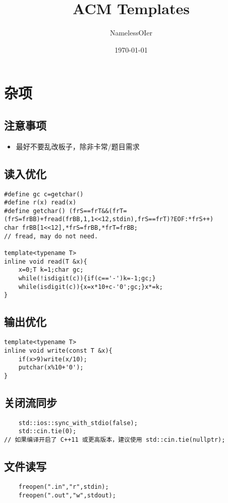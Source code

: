 \documentclass{ctexart}
\title{ACM Templates}
\date{\today}
\author{NamelessOIer}
\begin{document}
\maketitle
\setcounter{page}{0}
\thispagestyle{empty}
\newpage
{}
\tableofcontents
\newpage
{}
\pagestyle{fancy}
\section{杂项}
\subsection{注意事项}
\begin{itemize}
    \item 最好不要乱改板子，除非卡常/题目需求
\end{itemize}
\subsection{读入优化}
\begin{lstlisting}
#define gc c=getchar()
#define r(x) read(x)
#define getchar() (frS==frT&&(frT=(frS=frBB)+fread(frBB,1,1<<12,stdin),frS==frT)?EOF:*frS++)
char frBB[1<<12],*frS=frBB,*frT=frBB;
// fread, may do not need.

template<typename T>
inline void read(T &x){
	x=0;T k=1;char gc;
	while(!isdigit(c)){if(c=='-')k=-1;gc;}
	while(isdigit(c)){x=x*10+c-'0';gc;}x*=k;
}

\end{lstlisting}
\subsection{输出优化}
\begin{lstlisting}   
template<typename T>
inline void write(const T &x){
    if(x>9)write(x/10);
    putchar(x%10+'0');
}
\end{lstlisting}
\subsection{关闭流同步}
\begin{lstlisting}
    std::ios::sync_with_stdio(false);
    std::cin.tie(0);
// 如果编译开启了 C++11 或更高版本，建议使用 std::cin.tie(nullptr);
\end{lstlisting}
\subsection{文件读写}
\begin{lstlisting}
    freopen(".in","r",stdin);
    freopen(".out","w",stdout);
\end{lstlisting}
\end{document}
